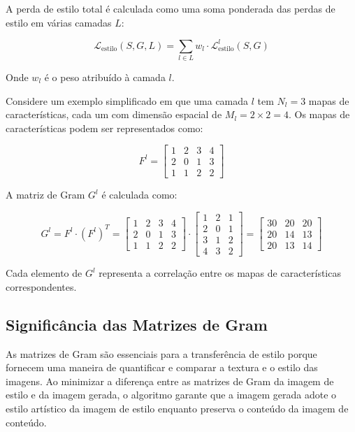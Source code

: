 \documentclass{tufte-handout}
\let\subsubsection\subsection
\begin{document}
A perda de estilo total é calculada como uma soma ponderada das perdas de estilo em várias camadas $L$:

\[
\mathcal{L}_{\text{estilo}} (S, G, L) = \sum_{l \in L} w_l \cdot \mathcal{L}_{\text{estilo}}^l (S, G)
\]

Onde $w_l$ é o peso atribuído à camada $l$.

\begin{exmp}

Considere um exemplo simplificado em que uma camada $l$ tem $N_l = 3$ mapas de características, cada um com dimensão espacial de $M_l = 2 \times 2 = 4$. Os mapas de características podem ser representados como:

\[
F^l = \begin{bmatrix}
1 & 2 & 3 & 4 \\
2 & 0 & 1 & 3 \\
1 & 1 & 2 & 2
\end{bmatrix}
\]

A matriz de Gram $G^l$ é calculada como:

\[
G^l = F^l \cdot (F^l)^T = \begin{bmatrix}
1 & 2 & 3 & 4 \\
2 & 0 & 1 & 3 \\
1 & 1 & 2 & 2
\end{bmatrix}
\cdot
\begin{bmatrix}
1 & 2 & 1 \\
2 & 0 & 1 \\
3 & 1 & 2 \\
4 & 3 & 2
\end{bmatrix}
= \begin{bmatrix}
30 & 20 & 20 \\
20 & 14 & 13 \\
20 & 13 & 14
\end{bmatrix}
\]

Cada elemento de $G^l$ representa a correlação entre os mapas de características correspondentes.
\end{exmp}

\subsubsection{Significância das Matrizes de Gram}

As matrizes de Gram são essenciais para a transferência de estilo porque fornecem uma maneira de quantificar e comparar a textura e o estilo das imagens. Ao minimizar a diferença entre as matrizes de Gram da imagem de estilo e da imagem gerada, o algoritmo garante que a imagem gerada adote o estilo artístico da imagem de estilo enquanto preserva o conteúdo da imagem de conteúdo.
\end{document}
